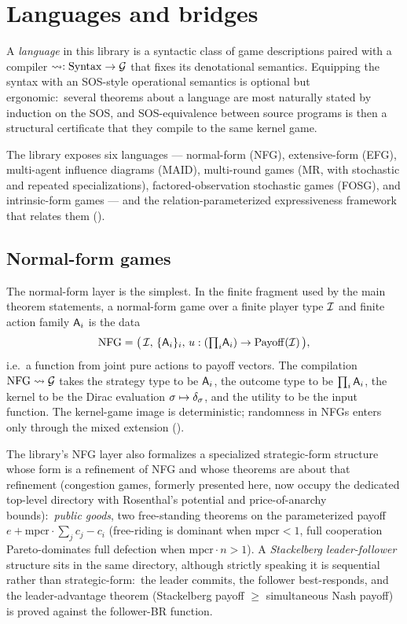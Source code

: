\section{Languages and bridges}
\label{sec:languages}

A \emph{language} in this library is a syntactic class of game
descriptions paired with a compiler $\rightsquigarrow : \mathrm{Syntax} \to
\mathcal{G}$ that fixes its denotational semantics.  Equipping the syntax
with an SOS-style operational semantics is optional but
ergonomic:\ several theorems about a language are most naturally
stated by induction on the SOS, and SOS-equivalence between source
programs is then a structural certificate that they compile to the
same kernel game.

The library exposes six languages — normal-form (NFG),
extensive-form (EFG), multi-agent influence diagrams (MAID),
multi-round games (MR, with stochastic and repeated specializations),
factored-observation stochastic games (FOSG), and intrinsic-form
games — and the relation-parameterized expressiveness framework
that relates them
().

\subsection{Normal-form games}
\label{sec:languages:nfg}

The normal-form layer is the simplest.  In the finite fragment used
by the main theorem statements, a normal-form game over a finite
player type $\mathcal{I}$ and finite action family $\mathsf{A}_i$ is the data
\[
  \mathrm{NFG} = \bigl(\,\mathcal{I},\,\{\mathsf{A}_i\}_i,\,u : ({\textstyle\prod_i}\mathsf{A}_i)
                  \to \mathrm{Payoff}(\mathcal{I})\,\bigr),
\]
i.e.\ a function from joint pure actions to payoff vectors.  The
compilation $\mathrm{NFG} \rightsquigarrow \mathcal{G}$ takes the strategy type to be
$\mathsf{A}_i$, the outcome type to be $\prod_i \mathsf{A}_i$, the kernel to
be the Dirac evaluation $\sigma \mapsto \delta_{\sigma}$, and the
utility to be the input function.  The kernel-game image is
deterministic; randomness in NFGs enters only through the mixed
extension ().

The library's NFG layer also formalizes a specialized
strategic-form structure whose form is a refinement of NFG and
whose theorems are about that refinement (congestion games,
formerly presented here, now occupy the dedicated top-level
 directory with Rosenthal's potential and
price-of-anarchy bounds):\
\emph{public goods}, two free-standing theorems on the
parameterized payoff $e + \mathrm{mpcr} \cdot \sum_j c_j - c_i$
(free-riding is dominant when $\mathrm{mpcr} < 1$, full
cooperation Pareto-dominates full defection when $\mathrm{mpcr}
\cdot n > 1$).  A \emph{Stackelberg leader-follower} structure
sits in the same directory, although strictly speaking it is
sequential rather than strategic-form:\ the leader commits, the
follower best-responds, and the leader-advantage theorem
(Stackelberg payoff $\ge$ simultaneous Nash payoff) is proved
against the follower-BR function.

